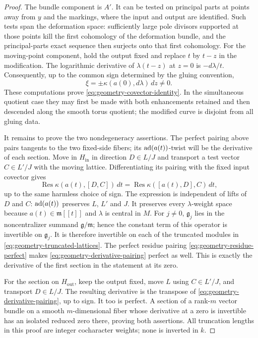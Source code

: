 \begin{proof}
The bundle component is $A'$.  It can be tested on principal parts
at points away from $y$ and the markings, where the input and output
are identified.  Such tests span the deformation space: sufficiently
large pole divisors supported at those points kill the first
cohomology of the deformation bundle, and the principal-parts exact
sequence then surjects onto that first cohomology.  For the moving-point
component, hold the output fixed and replace $t$ by $t-z$ in the
modification.  The logarithmic derivative of $\lambda(t-z)$ at $z=0$
is $-d\lambda/t$.  Consequently, up to the common sign determined by
the gluing convention,
\begin{equation}\label{eq:geometry-leg-covector}
                 \xi=\pm\kappa(a(0),d\lambda)\,dz\ne0.
\end{equation}
These computations prove \eqref{eq:geometry-covector-identity}.
In the simultaneous quotient case they may first be made with both
enhancements retained and then descended along the smooth torus
quotient; the modified curve is disjoint from all gluing data.

It remains to prove the two nondegeneracy assertions.  The perfect
pairing above pairs tangents to the two fixed-side fibers; its
$\operatorname{ad}(a(t))$-twist will be the derivative of each section.
Move in $H_{\mathrm{in}}$ in direction $D\in L/J$ and transport a
test vector $C\in L'/J$ with the moving lattice.  Differentiating its
pairing with the fixed input covector gives
\begin{equation}\label{eq:geometry-derivative-pairing}
 \operatorname{Res}\kappa(a(t),[D,C])\,dt
       =\operatorname{Res}\kappa([a(t),D],C)\,dt,
\end{equation}
up to the same harmless choice of sign.  The expression is independent
of lifts of $D$ and $C$: $\operatorname{ad}(a(t))$ preserves $L$, $L'$ and $J$.
It preserves every $\lambda$-weight space because
$a(t)\in\mathfrak m[[t]]$ and $\lambda$ is central in $M$.
For $j\ne0$, $\mathfrak g_j$ lies in the noncentralizer summand
$\mathfrak g/\mathfrak m$; hence the constant term of this operator
is invertible on $\mathfrak g_j$.  It is therefore invertible on
each of the truncated modules in
\eqref{eq:geometry-truncated-lattices}.  The perfect residue pairing
\eqref{eq:geometry-residue-perfect} makes
\eqref{eq:geometry-derivative-pairing} perfect as well.  This is exactly
the derivative of the first section in the statement at its zero.

For the section on $H_{\mathrm{out}}$, keep the output fixed, move
$L$ using $C\in L'/J$, and transport $D\in L/J$.  The resulting derivative is
the transpose of \eqref{eq:geometry-derivative-pairing}, up to sign.
It too is perfect.  A section of a rank-$m$ vector bundle on a smooth
$m$-dimensional fiber whose derivative at a zero is invertible has
an isolated reduced zero there, proving both assertions.  All
truncation lengths in this proof are integer cocharacter weights;
none is inverted in $k$.
\end{proof}

